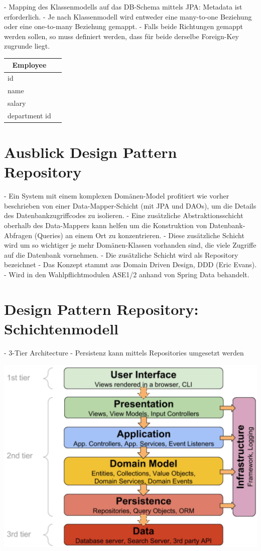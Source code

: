 - Mapping des Klassenmodells auf das DB-Schema mittels JPA: Metadata ist erforderlich.
- Je nach Klassenmodell wird entweder eine many-to-one Beziehung oder eine one-to-many Beziehung gemappt.
- Falls beide Richtungen gemappt werden sollen, so muss definiert werden, dass für beide derselbe Foreign-Key zugrunde liegt.
\begin{tabular}{|l|l|}
\hline \multicolumn{1}{|c|}{ Employee } \\
\hline id \\
\hline name \\
\hline salary \\
\hline department id \\
\hline
\end{tabular}

\section*{Ausblick Design Pattern Repository}
- Ein System mit einem komplexen Domänen-Model profitiert wie vorher beschrieben von einer Data-Mapper-Schicht (mit JPA und DAOs), um die Details des Datenbankzugriffcodes zu isolieren.
- Eine zusätzliche Abstraktionsschicht oberhalb des Data-Mappers kann helfen um die Konstruktion von Datenbank-Abfragen (Queries) an einem Ort zu konzentrieren.
- Diese zusätzliche Schicht wird um so wichtiger je mehr Domänen-Klassen vorhanden sind, die viele Zugriffe auf die Datenbank vornehmen.
- Die zusätzliche Schicht wird als Repository bezeichnet
- Das Konzept stammt aus Domain Driven Design, DDD (Eric Evans).
- Wird in den Wahlpflichtmodulen ASE1/2 anhand von Spring Data behandelt.

\section*{Design Pattern Repository: Schichtenmodell}
- 3-Tier Architecture
- Persistenz kann mittels Repositories umgesetzt werden

\includegraphics[width=\linewidth]{images/2025_01_02_5ba1dc702e9f94ba8e06g-35.jpg}

